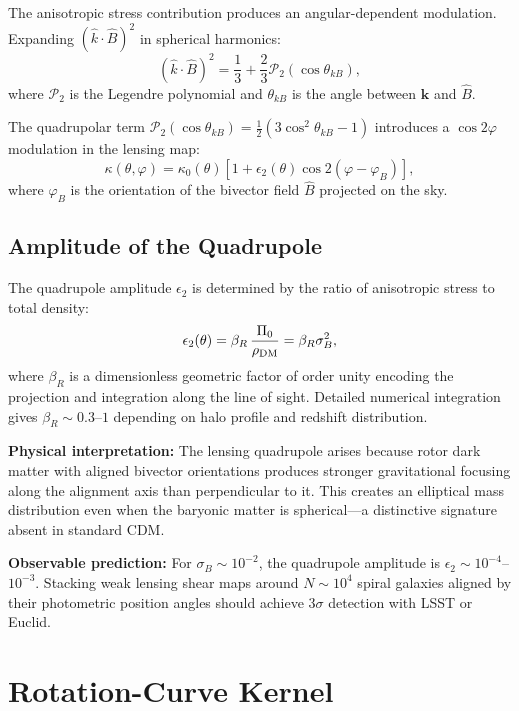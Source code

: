 \documentclass[11pt,a4paper]{article}
\numberwithin{equation}{section}
\theoremstyle{plain}
\theoremstyle{definition}
\theoremstyle{remark}
\begin{document}
The anisotropic stress contribution produces an angular-dependent modulation. Expanding $(\hat k \cdot \hat B)^2$ in spherical harmonics:
\begin{equation}
(\hat k \cdot \hat B)^2 = \frac{1}{3} + \frac{2}{3}\mathcal{P}_2(\cos\theta_{k B}),
\end{equation}
where $\mathcal{P}_2$ is the Legendre polynomial and $\theta_{k B}$ is the angle between $\bm{k}$ and $\hat B$.

The quadrupolar term $\mathcal{P}_2(\cos\theta_{k B}) = \frac{1}{2}(3\cos^2\theta_{k B} - 1)$ introduces a $\cos 2\varphi$ modulation in the lensing map:
\begin{equation}
\kappa(\theta, \varphi) = \kappa_0(\theta)\left[1 + \epsilon_2(\theta)\cos 2(\varphi - \varphi_B)\right],
\end{equation}
where $\varphi_B$ is the orientation of the bivector field $\hat B$ projected on the sky.

\subsection{Amplitude of the Quadrupole}

The quadrupole amplitude $\epsilon_2$ is determined by the ratio of anisotropic stress to total density:
\begin{equation}
\epsilon_2(\theta) = \beta_R\,\frac{\Pi_0}{\rho_{\rm DM}} = \beta_R\sigma_B^2,
\end{equation}
where $\beta_R$ is a dimensionless geometric factor of order unity encoding the projection and integration along the line of sight. Detailed numerical integration gives $\beta_R \sim 0.3$--$1$ depending on halo profile and redshift distribution.

\textbf{Physical interpretation:} The lensing quadrupole arises because rotor dark matter with aligned bivector orientations produces stronger gravitational focusing along the alignment axis than perpendicular to it. This creates an elliptical mass distribution even when the baryonic matter is spherical---a distinctive signature absent in standard CDM.

\textbf{Observable prediction:} For $\sigma_B \sim 10^{-2}$, the quadrupole amplitude is $\epsilon_2 \sim 10^{-4}$--$10^{-3}$. Stacking weak lensing shear maps around $N \sim 10^4$ spiral galaxies aligned by their photometric position angles should achieve $3\sigma$ detection with LSST or Euclid.

\section{Rotation-Curve Kernel}\label{app:rc}
\end{document}
